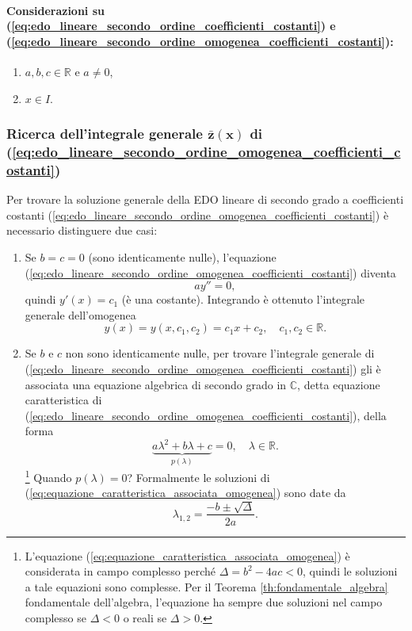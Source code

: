 \paragraph{Considerazioni su (\ref{eq:edo_lineare_secondo_ordine_coefficienti_costanti}) e (\ref{eq:edo_lineare_secondo_ordine_omogenea_coefficienti_costanti}):}
\begin{enumerate}
	\item $a,b,c \in\mathbb{R}$ e $a\neq 0$,
	\item $x\in I$.
\end{enumerate}

\subsubsection{Ricerca dell'integrale generale \texorpdfstring{$\boldsymbol{\bar z(x)}$}{z(x)} di (\ref{eq:edo_lineare_secondo_ordine_omogenea_coefficienti_costanti})}
Per trovare la soluzione generale della EDO lineare di secondo grado a coefficienti costanti (\ref{eq:edo_lineare_secondo_ordine_omogenea_coefficienti_costanti}) è necessario distinguere due casi:
\begin{enumerate}
	\item Se $b=c=0$ (sono identicamente nulle), l'equazione (\ref{eq:edo_lineare_secondo_ordine_omogenea_coefficienti_costanti}) diventa
	\begin{equation*}
		a y''=0,
	\end{equation*}
	quindi $y'(x)=c_1$ (è una costante). Integrando è ottenuto l'integrale generale dell'omogenea
	\begin{equation*}
		y(x)=y(x,c_1,c_2) 
		= c_1 x+c_2,\quad c_1,c_2\in\mathbb{R}.
	\end{equation*}
	\item Se $b$ e $c$ non sono identicamente nulle, per trovare l'integrale generale di (\ref{eq:edo_lineare_secondo_ordine_omogenea_coefficienti_costanti}) gli è associata una equazione algebrica di secondo grado in $\mathbb{C}$, detta equazione caratteristica di (\ref{eq:edo_lineare_secondo_ordine_omogenea_coefficienti_costanti}), della forma
	\begin{equation}\label{eq:equazione_caratteristica_associata_omogenea}
		\underbrace{a\lambda^2 + b\lambda + c}_{p(\lambda)} = 0,\quad\lambda\in\mathbb{R}.
	\end{equation}
	\footnote{L'equazione (\ref{eq:equazione_caratteristica_associata_omogenea}) è considerata in campo complesso perché $\Delta = b^2-4ac<0$, quindi le soluzioni a tale equazioni sono complesse. Per il Teorema \ref{th:fondamentale_algebra} fondamentale dell'algebra, l'equazione ha sempre due soluzioni nel campo complesso se $\Delta<0$ o reali se $\Delta>0$.} Quando $p(\lambda)=0$? Formalmente le soluzioni di (\ref{eq:equazione_caratteristica_associata_omogenea}) sono date da
	\begin{equation*}
		\lambda_{1,2} = \frac{-b\pm\sqrt{\Delta}}{2a}.
	\end{equation*}
\end{enumerate}

